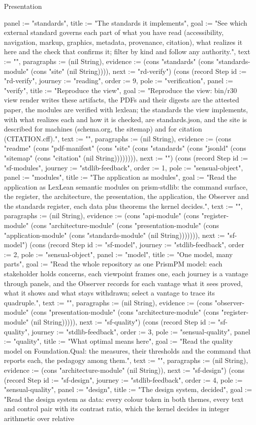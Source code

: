 \begin{lexlean}{Presentation}
\begin{semanticmodule}
{panel := "standards", title := "The standards it implements", goal := "See which external standard governs each part of what you have read (accessibility, navigation, markup, graphics, metadata, provenance, citation), what realizes it here and the check that confirms it; filter by kind and follow any authority.", text := "", paragraphs := (nil String), evidence := (cons "standards" (cons "standards-module" (cons "site" (nil String)))), next := "rd-verify"}) (cons (record Step {id := "rd-verify", journey := "reading", order := 9, pole := "verification", panel := "verify", title := "Reproduce the view", goal := "Reproduce the view: bin/r30 view render writes these artifacts, the PDFs and their digests are the attested paper, the modules are verified with lexlean; the standards the view implements, with what realizes each and how it is checked, are standards.json, and the site is described for machines (schema.org, the sitemap) and for citation (CITATION.cff).", text := "", paragraphs := (nil String), evidence := (cons "readme" (cons "pdf-manifest" (cons "site" (cons "standards" (cons "jsonld" (cons "sitemap" (cons "citation" (nil String)))))))), next := ""}) (cons (record Step {id := "sf-modules", journey := "stdlib-feedback", order := 1, pole := "sensual-object", panel := "modules", title := "The application as modules", goal := "Read the application as LexLean semantic modules on prism-stdlib: the command surface, the register, the architecture, the presentation, the application, the Observer and the standards register, each data plus theorems the kernel decides.", text := "", paragraphs := (nil String), evidence := (cons "api-module" (cons "register-module" (cons "architecture-module" (cons "presentation-module" (cons "application-module" (cons "standards-module" (nil String))))))), next := "sf-model"}) (cons (record Step {id := "sf-model", journey := "stdlib-feedback", order := 2, pole := "sensual-object", panel := "model", title := "One model, many parts", goal := "Read the whole repository as one PrismPM model: each stakeholder holds concerns, each viewpoint frames one, each journey is a vantage through panels, and the Observer records for each vantage what it sees proved, what it shows and what stays withdrawn; select a vantage to trace its quadruple.", text := "", paragraphs := (nil String), evidence := (cons "observer-module" (cons "presentation-module" (cons "architecture-module" (cons "register-module" (nil String))))), next := "sf-quality"}) (cons (record Step {id := "sf-quality", journey := "stdlib-feedback", order := 3, pole := "sensual-quality", panel := "quality", title := "What optimal means here", goal := "Read the quality model on Foundation.Qual: the measures, their thresholds and the command that reports each, the pedagogy among them.", text := "", paragraphs := (nil String), evidence := (cons "architecture-module" (nil String)), next := "sf-design"}) (cons (record Step {id := "sf-design", journey := "stdlib-feedback", order := 4, pole := "sensual-quality", panel := "design", title := "The design system, decided", goal := "Read the design system as data: every colour token in both themes, every text and control pair with its contrast ratio, which the kernel decides in integer arithmetic over relative }
\end{semanticmodule}
\end{lexlean}
